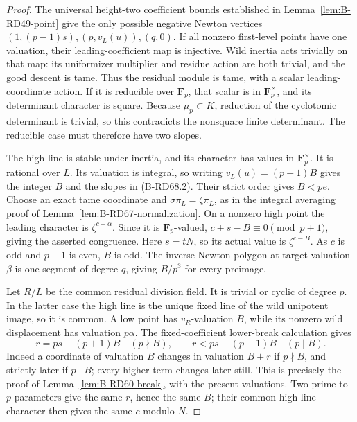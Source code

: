 \begin{proof}
The universal height-two coefficient bounds established in
Lemma~\ref{lem:B-RD49-point} give the only possible negative
Newton vertices \((1,(p-1)s),(p,v_L(u)),(q,0)\).
If all nonzero first-level points have one valuation, their
leading-coefficient map is injective. Wild inertia acts trivially
on that map: its uniformizer multiplier and residue action are
both trivial, and the good descent is tame. Thus the residual
module is tame, with a scalar leading-coordinate action.
If it is reducible over \(\mathbf F_p\), that scalar is in
\(\mathbf F_p^\times\), and its determinant character is square.
Because \(\mu_p\subset K\), reduction of the cyclotomic determinant
is trivial, so this contradicts the nonsquare finite determinant.
The reducible case must therefore have two slopes.

The high line is stable under inertia, and its character has
values in \(\mathbf F_p^\times\). It is rational over \(L\).
Its valuation is integral, so writing
\(v_L(u)=(p-1)B\) gives the integer \(B\) and the slopes
in (B-RD68.2). Their strict order gives \(B<pe\).
Choose an exact tame coordinate and
\(\sigma\pi_L=\zeta\pi_L\), as in the integral averaging proof
of Lemma~\ref{lem:B-RD67-normalization}. On a nonzero high
point the leading character is \(\zeta^{c+\alpha}\).
Since it is \(\mathbf F_p\)-valued,
\(c+s-B\equiv0\pmod{p+1}\), giving the asserted congruence.
Here \(s=tN\), so its actual value is \(\zeta^{c-B}\).
As \(c\) is odd and \(p+1\) is even, \(B\) is odd.
The inverse Newton polygon at target valuation \(\beta\)
is one segment of degree \(q\), giving \(B/p^3\) for every
preimage.

Let \(R/L\) be the common residual division field. It is trivial
or cyclic of degree \(p\). In the latter case the high line
is the unique fixed line of the wild unipotent image, so it is
common. A low point has \(v_R\)-valuation \(B\), while its
nonzero wild displacement has valuation \(p\alpha\).
The fixed-coefficient lower-break calculation gives
\[
 r=ps-(p+1)B\quad(p\nmid B),\qquad
 r<ps-(p+1)B\quad(p\mid B).
 \tag{B-RD68.3}
\]
Indeed a coordinate of valuation \(B\) changes in valuation
\(B+r\) if \(p\nmid B\), and strictly later if \(p\mid B\);
every higher term changes later still. This is precisely the
proof of Lemma~\ref{lem:B-RD60-break}, with the present valuations.
Two prime-to-\(p\) parameters give the same \(r\), hence the
same \(B\); their common high-line character then gives the
same \(c\) modulo \(N\).


\end{proof}
